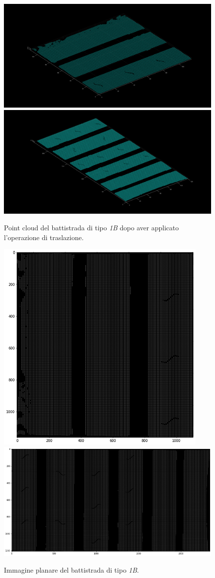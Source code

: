 \begin{figure}[H]
	\centering
	\includegraphics[width=0.45\columnwidth]{./pictures/batt_1b_analisi_1_5.png}
	\includegraphics[width=0.45\columnwidth]{./pictures/batt_1b_analisi_2_5.png}
	\caption{Point cloud del battistrada di tipo \textit{1B} dopo aver applicato l'operazione di traslazione.}\label{fig:batt_1b_analisi_5}
\end{figure}

\begin{figure}[H]
	\centering
	\includegraphics[height=0.32\columnwidth]{./pictures/batt_1b_analisi_1_6.png}
	\includegraphics[height=0.32\columnwidth]{./pictures/batt_1b_analisi_2_6.png}
	\caption{Immagine planare del battistrada di tipo \textit{1B}.}\label{fig:batt_1b_analisi_6}
\end{figure}

